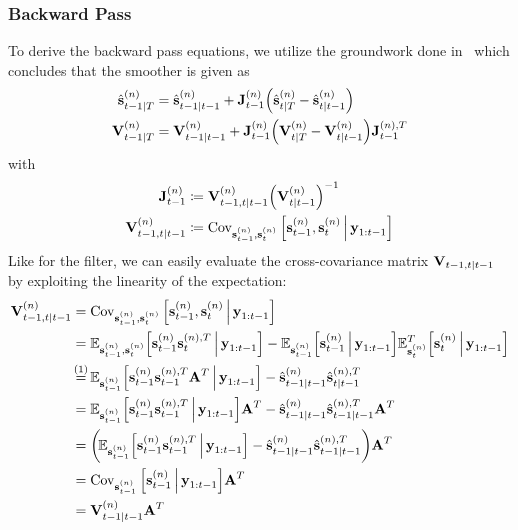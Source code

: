 		\subsubsection{Backward Pass}
			To derive the backward pass equations, we utilize the groundwork done in~\cite{deisenrothProbabilisticPerspectiveGaussian2011} which concludes that the smoother is given as
			\begin{align*}
				\hat{\boldsymbol{\mathrm{s}}}_{t - 1 \vert T}^{(n)} &= \hat{\boldsymbol{\mathrm{s}}}_{t - 1 \vert t - 1}^{(n)} + \boldsymbol{\mathrm{J}}_{t - 1}^{(n)} \Big(\hat{\boldsymbol{\mathrm{s}}}_{t \vert T}^{(n)} - \hat{\boldsymbol{\mathrm{s}}}_{t \vert t - 1}^{(n)}\Big) \\
				\boldsymbol{\mathrm{V}}_{t - 1 \vert T}^{(n)}       &= \boldsymbol{\mathrm{V}}_{t - 1 \vert t - 1}^{(n)} + \boldsymbol{\mathrm{J}}_{t - 1}^{(n)} \Big(\boldsymbol{\mathrm{V}}_{t \vert T}^{(n)} - \boldsymbol{\mathrm{V}}_{t \vert t - 1}^{(n)}\Big) \boldsymbol{\mathrm{J}}_{t - 1}^{(n), T}
			\end{align*}
			with
			\begin{align}
				\boldsymbol{\mathrm{J}}_{t - 1}^{(n)}                    &\coloneqq \boldsymbol{\mathrm{V}}_{t - 1, t \vert t - 1}^{(n)} \Big(\boldsymbol{\mathrm{V}}_{t \vert t - 1}^{(n)}\Big)^{-1}  \nonumber \\
				\boldsymbol{\mathrm{V}}_{t - 1, t \vert t - 1}^{(n)} &\coloneqq \operatorname{Cov}_{\boldsymbol{\mathrm{s}}_{t - 1}^{(n)}, \boldsymbol{\mathrm{s}}_t^{(n)}}\Big[\boldsymbol{\mathrm{s}}_{t - 1}^{(n)}, \boldsymbol{\mathrm{s}}_t^{(n)} \,\Big\vert\, \boldsymbol{\mathrm{y}}_{1:t - 1}\Big]  \label{eq:smootherPriorCrossCov}
			\end{align}
			Like for the filter, we can easily evaluate the cross-covariance matrix \( \boldsymbol{\mathrm{V}}_{t - 1, t \vert t - 1} \) by exploiting the linearity of the expectation:
			\begin{align*}
				\mat{V}_{t - 1, t \subgiven t - 1}^{(n)}
					&= \Cov_{\vec{s}_{t - 1}^{(n)}, \vec{s}_t^{(n)}}\Big[\vec{s}_{t - 1}^{(n)}, \vec{s}_t^{(n)} \Biggiven \vec{y}_{1:t - 1}\Big] \\
					&= \E_{\vec{s}_{t - 1}^{(n)}, \vec{s}_t^{(n)}}\Big[\vec{s}_{t - 1}^{(n)} \vec{s}_t^{(n), T} \Biggiven \vec{y}_{1:t - 1}\Big] - \E_{\vec{s}_{t - 1}^{(n)}}\Big[\vec{s}_{t - 1}^{(n)} \Biggiven \vec{y}_{1:t - 1}\Big] \E_{\vec{s}_t^{(n)}}^T\Big[\vec{s}_t^{(n)} \Biggiven \vec{y}_{1:t - 1}\Big] \\
					&\oversetfootnotemark{=} \E_{\vec{s}_{t - 1}^{(n)}}\Big[\vec{s}_{t - 1}^{(n)} \vec{s}_{t - 1}^{(n), T} \mat{A}^T \Biggiven \vec{y}_{1:t - 1}\Big] - \hat{\vec{s}}_{t - 1 \subgiven t - 1}^{(n)} \hat{\vec{s}}_{t \subgiven t - 1}^{(n), T} \\
					&= \E_{\vec{s}_{t - 1}^{(n)}}\Big[\vec{s}_{t - 1}^{(n)} \vec{s}_{t - 1}^{(n), T} \Biggiven \vec{y}_{1:t - 1}\Big] \mat{A}^T - \hat{\vec{s}}_{t - 1 \subgiven t - 1}^{(n)} \hat{\vec{s}}_{t - 1 \subgiven t - 1}^{(n), T} \mat{A}^T \\
					&= \bigg(\! \E_{\vec{s}_{t - 1}^{(n)}}\Big[\vec{s}_{t - 1}^{(n)} \vec{s}_{t - 1}^{(n), T} \Biggiven \vec{y}_{1:t - 1}\Big] - \hat{\vec{s}}_{t - 1 \subgiven t - 1}^{(n)} \hat{\vec{s}}_{t - 1 \subgiven t - 1}^{(n), T} \bigg) \mat{A}^T \\
					&= \Cov_{\vec{s}_{t - 1}^{(n)}}\Big[\vec{s}_{t - 1}^{(n)} \Biggiven \vec{y}_{1:t - 1}\Big] \mat{A}^T \\
					&= \mat{V}_{t - 1 \subgiven t - 1}^{(n)} \mat{A}^T
			\end{align*}
